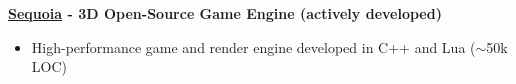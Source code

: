 \textbf{\href{https://github.com/thfabian/sequoia}{Sequoia} - 3D Open-Source Game Engine (actively developed)}
\begin{itemize}
 \item High-performance game and render engine developed in C++ and Lua ($\sim$50k LOC)
\end{itemize}